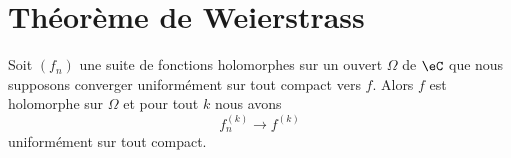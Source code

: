 \section{Théorème de Weierstrass}

\begin{theorem}       \label{ThoArYtQO}
    Soit \( (f_n)\) une suite de fonctions holomorphes sur un ouvert \( \Omega\) de \( \eC\) que nous supposons converger uniformément sur tout compact vers \( f\). Alors \( f\) est holomorphe sur \( \Omega\) et pour tout \( k\) nous avons
    \begin{equation}
        f^{(k)}_n\to f^{(k)}
    \end{equation}
    uniformément sur tout compact.
\end{theorem}

